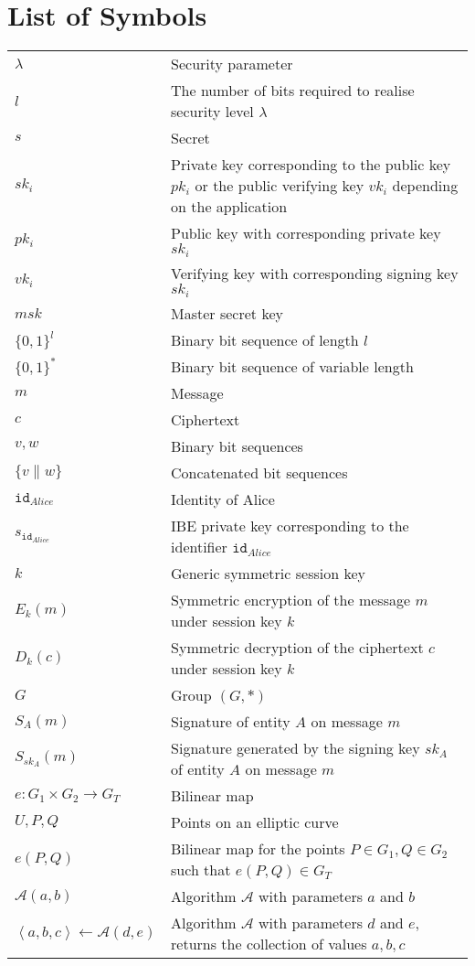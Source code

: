 \documentclass[master=eelt,masteroption=em]{kulemt}
\theoremstyle{plain}
\theoremstyle{definition}
\newcommand{\id}[1]{\ensuremath{\mathtt{id}_{#1}}}
\begin{document}
\chapter{List of Symbols}
\begin{flushleft}
 \renewcommand{\arraystretch}{1.1}
 \begin{tabularx}{\textwidth}{@{}p{30mm}X@{}}
  $\lambda$ & Security parameter \\
  $l$ & The number of bits required to realise security level $\lambda$ \\
  $s$ & Secret \\
  $sk_i$ & Private key corresponding to the public key $pk_i$ or the public verifying key $vk_i$ depending on the application \\
  $pk_i$ & Public key with corresponding private key $sk_i$ \\
  $vk_i$ & Verifying key with corresponding signing key $sk_i$ \\
  $msk$ & Master secret key \\
  $\{ 0,1 \}^l$ & Binary bit sequence of length $l$ \\
  $\{ 0,1 \}^*$ & Binary bit sequence of variable length \\
  $m$ & Message \\
  $c$ & Ciphertext \\
  $v, w$ & Binary bit sequences \\
  $\{ v \parallel w \}$ & Concatenated bit sequences \\
  \id{Alice} & Identity of Alice \\ 
  $s_{\id{Alice}}$ & IBE private key corresponding to the identifier \id{Alice} \\
  $k$ & Generic symmetric session key \\
  $E_k \left( m \right)$ & Symmetric encryption of the message $m$ under session key $k$ \\
  $D_k \left( c \right)$ & Symmetric decryption of the ciphertext $c$ under session key $k$ \\
  $G$ & Group $\left( G, * \right)$ \\
  $S_A \left( m \right)$ & Signature of entity $A$ on message $m$ \\
  $S_{sk_A} \left( m \right)$ & Signature generated by the signing key $sk_A$ of entity $A$ on message $m$ \\
  $e: G_1 \times G_2 \rightarrow G_T$ & Bilinear map \\
  $U, P, Q$ & Points on an elliptic curve \\
  $e \left( P, Q \right)$ & Bilinear map  for the points $P \in G_1, Q \in G_2$ such that $e \left( P, Q \right) \in G_T$ \\  
  $\mathcal{A} \left( a, b \right)$ & Algorithm $\mathcal{A}$ with parameters $a$ and $b$ \\
  $\left< a, b, c \right> \leftarrow \mathcal{A}( d, e )$ & Algorithm $\mathcal{A}$ with parameters $d$ and $e$, returns the collection of values $a, b, c$ \\
  \end{tabularx}
\end{flushleft}
\end{document}
